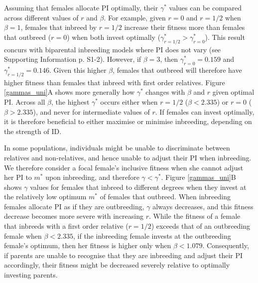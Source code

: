 \documentclass[12pt]{article}
\begin{document}
Assuming that females allocate PI optimally, their $\gamma^{*}$ values can be compared across different values of $r$ and $\beta$. For example, given $r=0$ and $r=1/2$ when $\beta=1$, females that inbreed by $r=1/2$ increase their fitness more than females that outbreed ($r=0$) when both invest optimally ($\gamma^{*}_{r=1/2}>\gamma^{*}_{r=0}$). This result concurs with biparental inbreeding models where PI does not vary (see Supporting Information p. S1-2). However, if $\beta=3$, then $\gamma^{*}_{r=0}=0.159$ and $\gamma^{*}_{r=1/2}=0.146$. Given this higher $\beta$, females that outbreed will therefore have higher fitness than females that inbreed with first order relatives. Figure \ref{gammas_uni}A shows more generally how $\gamma^{*}$ changes with $\beta$ and $r$ given optimal PI. Across all $\beta$, the highest $\gamma^{*}$ occurs either when $r=1/2$ ($\beta < 2.335$) or $r=0$ ($\beta > 2.335$), and never for intermediate values of $r$. If females can invest optimally, it is therefore beneficial to either maximise or minimise inbreeding, depending on the strength of ID.

In some populations, individuals might be unable to discriminate between relatives and non-relatives, and hence unable to adjust their PI when inbreeding. We therefore consider a focal female's inclusive fitness when she cannot adjust her PI to $m^{*}$ upon inbreeding, and therefore $\gamma < \gamma^{*}$. Figure \ref{gammas_uni}B shows $\gamma$ values for females that inbreed to different degrees when they invest at the relatively low optimum $m^{*}$ of females that outbreed. When inbreeding females allocate PI as if they are outbreeding, $\gamma$ always decreases, and this fitness decrease becomes more severe with increasing $r$. While the fitness of a female that inbreeds with a first order relative ($r=1/2$) exceeds that of an outbreeding female when $\beta < 2.335$, if the inbreeding female invests at the outbreeding female's optimum, then her fitness is higher only when $\beta < 1.079$. Consequently, if parents are unable to recognise that they are inbreeding and adjust their PI accordingly, their fitness might be decreased severely relative to optimally investing parents. 
\end{document}
